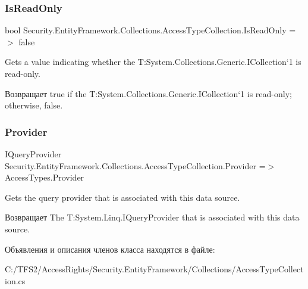 \subsubsection{\texorpdfstring{Is\+Read\+Only}{IsReadOnly}}
{\footnotesize\ttfamily bool Security.\+Entity\+Framework.\+Collections.\+Access\+Type\+Collection.\+Is\+Read\+Only =$>$ false}



Gets a value indicating whether the T\+:\+System.\+Collections.\+Generic.\+I\+Collection`1 is read-\/only. 

\begin{DoxyReturn}{Возвращает}
true if the T\+:\+System.\+Collections.\+Generic.\+I\+Collection`1 is read-\/only; otherwise, false. 
\end{DoxyReturn}
\mbox{\label{class_security_1_1_entity_framework_1_1_collections_1_1_access_type_collection_a3cd25e35c9889e8ef8eea2f5c07ee45a}} 
\subsubsection{\texorpdfstring{Provider}{Provider}}
{\footnotesize\ttfamily I\+Query\+Provider Security.\+Entity\+Framework.\+Collections.\+Access\+Type\+Collection.\+Provider =$>$ Access\+Types.\+Provider}



Gets the query provider that is associated with this data source. 

\begin{DoxyReturn}{Возвращает}
The T\+:\+System.\+Linq.\+I\+Query\+Provider that is associated with this data source. 
\end{DoxyReturn}


Объявления и описания членов класса находятся в файле\+:\begin{DoxyCompactItemize}
\item 
C\+:/\+T\+F\+S2/\+Access\+Rights/\+Security.\+Entity\+Framework/\+Collections/Access\+Type\+Collection.\+cs\end{DoxyCompactItemize}
